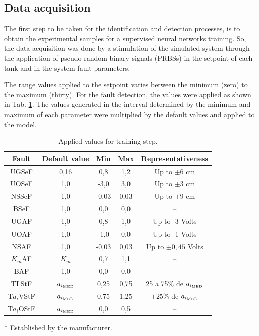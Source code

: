 \documentclass[10pt,fleqn,a4paper]{article}
\begin{document}
\subsection{Data acquisition}
The first step to be taken for the identification and detection processes, is to
obtain the experimental samples for a supervised neural networks training. So,
the data acquisition was done by a stimulation of the simulated system through
the application of pseudo random binary signals (PRBSs) in the setpoint of each
tank and in the system fault parameters.

The range values applied to the setpoint varies between the minimum (zero) to
the maximum (thirty). For the fault detection, the values were applied as shown
in Tab. \ref{tab:values}. The values generated in the interval determined by the
minimum and maximum of each parameter were multiplied by the default values and
applied to the model.

\begin{table}[htb]
\small
\caption{Applied values for training step.}
\label{tab:values}
\centering
\begin{threeparttable}
\begin{tabular}{|c|c|c|c|c|}
\hline
{\bf Fault} & {\bf Default value} & {\bf Min} & {\bf Max} & 
{\bf Representativeness}\\
\hline
UGSeF & 0,16\tnote{$*$} & 
0,8 & 1,2 & Up to $\pm 6$ cm\\
\hline
UOSeF & 1,0 & -3,0 & 3,0 & Up to $\pm 3$ cm\\
\hline
NSSeF & 1,0 & -0,03 & 0,03 & Up to $\pm 9$ cm\\
\hline
BSeF & 1,0 & 0,0 & 0,0 & -- \\
\hline
UGAF & 1,0 & 0,8 & 1,0 & Up to -3 Volts\\
\hline
UOAF & 1,0 & -1,0 & 0,0 & Up to -1 Volts\\
\hline
NSAF & 1,0 & -0,03 & 0,03 & Up to $\pm 0,45$ Volts\\
\hline
$K_m$AF & $K_m$ & 0,7 & 1,1 & --\\
\hline
BAF & 1,0 & 0,0 & 0,0 & --\\
\hline
TLStF & $a_{i_{\text{\tiny MED}}}$ & 
0,25 & 0,75 & 25 a 75\% de $a_{i_{\text{\tiny MED}}}$\\
\hline
T$a_i$VStF & $a_{i_{\text{\tiny MED}}}$ & 
0,75 & 1,25 & $\pm 25\%$ de $a_{i_{\text{\tiny MED}}}$\\
\hline
T$a_i$OStF & $a_{i_{\text{\tiny MED}}}$ & 
0,0 & 0,5 & --\\
\hline
\end{tabular}
\begin{tablenotes}
\item [$*$] Established by the manufacturer.
\end{tablenotes}
\end{threeparttable}
\end{table}
\end{document}
